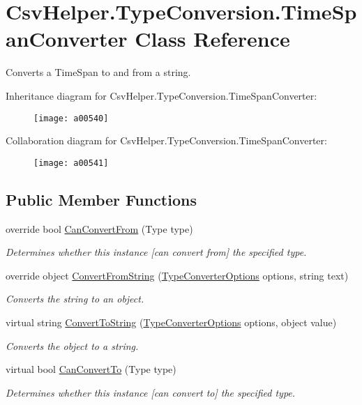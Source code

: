 \hypertarget{a00154}{\section{Csv\-Helper.\-Type\-Conversion.\-Time\-Span\-Converter Class Reference}
\label{a00154}
}


Converts a Time\-Span to and from a string.  




Inheritance diagram for Csv\-Helper.\-Type\-Conversion.\-Time\-Span\-Converter\-:
\nopagebreak
\begin{figure}[H]
\begin{center}
\leavevmode
\texttt{[image: a00540]}
\end{center}
\end{figure}


Collaboration diagram for Csv\-Helper.\-Type\-Conversion.\-Time\-Span\-Converter\-:
\nopagebreak
\begin{figure}[H]
\begin{center}
\leavevmode
\texttt{[image: a00541]}
\end{center}
\end{figure}
\subsection*{Public Member Functions}
\begin{DoxyCompactItemize}
\item 
override bool \hyperlink{a00154_ae3f8d46f5176d2ae08ac3fcdda1951e7}{Can\-Convert\-From} (Type type)
\begin{DoxyCompactList}\small\item\em Determines whether this instance \mbox{[}can convert from\mbox{]} the specified type. \end{DoxyCompactList}\item 
override object \hyperlink{a00154_a0f2536c88227a94822d0b7730eedf3eb}{Convert\-From\-String} (\hyperlink{a00156}{Type\-Converter\-Options} options, string text)
\begin{DoxyCompactList}\small\item\em Converts the string to an object. \end{DoxyCompactList}\item 
virtual string \hyperlink{a00084_a36cb2f9b24f15a671293f3a722324c27}{Convert\-To\-String} (\hyperlink{a00156}{Type\-Converter\-Options} options, object value)
\begin{DoxyCompactList}\small\item\em Converts the object to a string. \end{DoxyCompactList}\item 
virtual bool \hyperlink{a00084_acb65bd8c8199d88d5b1629ae35d18514}{Can\-Convert\-To} (Type type)
\begin{DoxyCompactList}\small\item\em Determines whether this instance \mbox{[}can convert to\mbox{]} the specified type. \end{DoxyCompactList}\end{DoxyCompactItemize}


